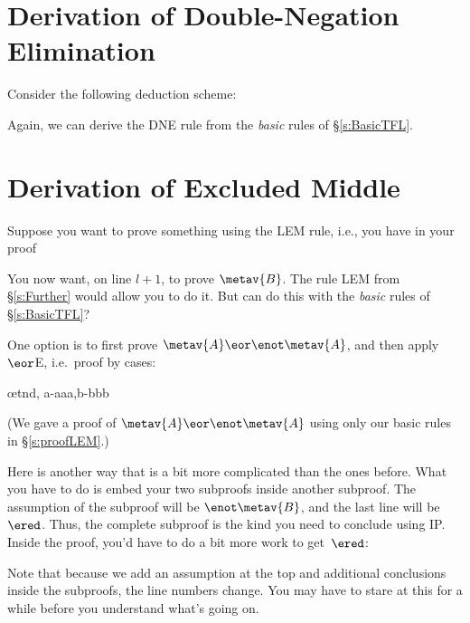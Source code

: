 \section{Derivation of Double-Negation Elimination}
Consider the following deduction scheme:
	\begin{fitchproof}
	\open
	\close
\end{fitchproof}
Again,  we can derive the DNE rule from the \emph{basic} rules of \S\ref{s:BasicTFL}.

\section{Derivation of Excluded Middle}
Suppose you want to prove something using the LEM rule, i.e., you have in your proof
\begin{fitchproof}
  \open
  \close
  \open
  \close
\end{fitchproof}
You now want, on line $l+1$, to prove $\metav{B}$. The rule LEM from \S\ref{s:Further} would allow you to do it. But can do this with the \emph{basic} rules of \S\ref{s:BasicTFL}?

One option is to first prove $\metav{A} \eor \enot\metav{A}$, and then apply $\eor$E, i.e.\ proof by cases:
\begin{fitchproof}
  \open
  \close
  \open
  \close
  \ellipsesline
  \oe{tnd, a-aaa,b-bbb}
\end{fitchproof}
(We gave a proof of $\metav{A} \eor \enot\metav{A}$ using only our basic rules in \S\ref{s:proofLEM}.)

Here is another way that is a bit more complicated than the ones before. What you have to do is embed your two subproofs inside another subproof. The assumption of the subproof will be $\enot \metav{B}$, and the last line will be $\ered$. Thus, the complete subproof is the kind you need to conclude  using IP. Inside the proof, you'd have to do a bit more work to get~$\ered$:
\begin{fitchproof}
  \open
  \open
  \ellipsesline
  \close
  \open
  \ellipsesline
  \close
  \close
\end{fitchproof}
Note that because we add an assumption at the top and additional conclusions inside the subproofs, the line numbers change. You may have to stare at this for a while before you understand what's going on.


